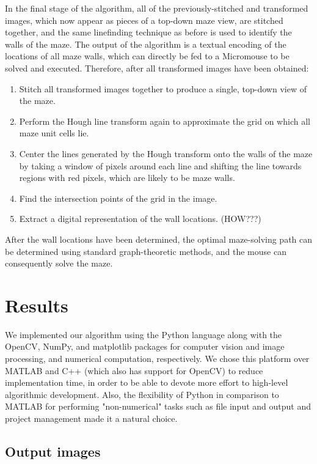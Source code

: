 \documentclass[10pt,twocolumn,letterpaper]{article}
\begin{document}
In the final stage of the algorithm, all of the previously-stitched and transformed images, which now appear as pieces
of a top-down maze view, are stitched together, and the same linefinding technique as before is used to identify the
walls of the maze.  The output of the algorithm is a textual encoding of the locations of all maze walls, which can
directly be fed to a Micromouse to be solved and executed.  Therefore, after all transformed images have been obtained:

\begin{enumerate}
	\item Stitch all transformed images together to produce a single, top-down view of the maze.
	\item Perform the Hough line transform again to approximate the grid on which all maze unit cells lie.
	\item Center the lines generated by the Hough transform onto the walls of the maze by taking a window of pixels
	around each line and shifting the line towards regions with red pixels, which are likely to be maze walls.
	\item Find the intersection points of the grid in the image.
	\item Extract a digital representation of the wall locations. (HOW???)
\end{enumerate}

After the wall locations have been determined, the optimal maze-solving path can be determined using standard 
graph-theoretic methods, and the mouse can consequently solve the maze.

\section{Results}
\label{sec:results}

We implemented our algorithm using the Python language along with the OpenCV, NumPy, and matplotlib packages for
computer vision and image processing, and numerical computation, respectively.  We chose this platform over MATLAB and
C++ (which also has support for OpenCV) to reduce implementation time, in order to be able to devote more effort to
high-level algorithmic development.  Also, the flexibility of Python in comparison to MATLAB for performing 
"non-numerical" tasks such as file input and output and project management made it a natural choice.

\subsection{Output images}
\label{sub:output_images}
\end{document}
